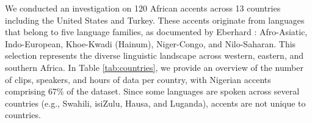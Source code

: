 \documentclass[11pt,a4paper]{article}
\begin{document}
We conducted an investigation on 120 African accents across 13 countries including the United States and Turkey. These accents originate from languages that belong to five language families, as documented by Eberhard \citep{Ethnologue_Eberhard}: Afro-Asiatic, Indo-European, Khoe-Kwadi (Hainum), Niger-Congo, and Nilo-Saharan. This selection represents the diverse linguistic landscape across western, eastern, and southern Africa. In Table \ref{tab:countries}, we provide an overview of the number of clips, speakers, and hours of data per country, with Nigerian accents comprising 67\% of the dataset. Since some languages are spoken across several countries (e.g., Swahili, isiZulu, Hausa, and Luganda), accents are not unique to countries.



\end{document}
